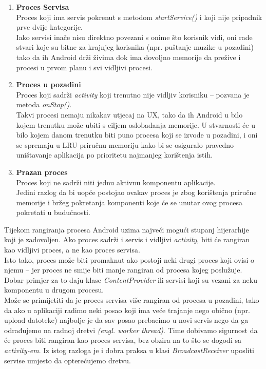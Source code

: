 \documentclass[times, utf8, zavrsni]{fer}
\begin{document}
\begin{enumerate}
\item
\textbf{Proces Servisa}\\
Proces koji ima servis pokrenut s metodom \textit{startService()} i koji nije pripadnik prve dvije kategorije.\\
Iako servisi inače nisu direktno povezani s onime što korisnik vidi, oni rade stvari koje su bitne za krajnjeg korisnika (npr. puštanje muzike u pozadini) tako da ih Android drži živima dok ima dovoljno memorije da prežive i procesi u prvom planu i svi vidljivi procesi.

\item
\textbf{Proces u pozadini}\\
Proces koji sadrži \textit{activity} koji trenutno nije vidljiv korisniku – pozvana je \linebreak metoda \textit{onStop()}.\\
Takvi procesi nemaju nikakav utjecaj na UX, tako da ih Android u bilo kojem trenutku može ubiti s ciljem oslobađanja memorije. U stvarnosti će u bilo kojem danom trenutku biti puno procesa koji se izvode u pozadini, i oni se spremaju u LRU priručnu memoriju kako bi se osiguralo pravedno uništavanje aplikacija po prioritetu najmanjeg korištenja istih.

\item
\textbf{Prazan proces}\\
Proces koji ne sadrži niti jednu aktivnu komponentu aplikacije.\\
Jedini razlog da bi uopće postojao ovakav proces je zbog korištenja priručne memorije i bržeg pokretanja komponenti koje će se unutar ovog procesa pokretati u budućnosti.

\end{enumerate}

Tijekom rangiranja procesa Android uzima najveći mogući stupanj hijerarhije koji je zadovoljen. Ako proces sadrži i servis i vidljivi \textit{activity}, biti će rangiran kao vidljivi proces, a ne kao proces servisa.\\

Isto tako, proces može biti promaknut ako postoji neki drugi proces koji ovisi o njemu – jer proces ne smije biti manje rangiran od procesa kojeg poslužuje. Dobar primjer za to daju klase \textit{ContentProvider} ili servisi koji su vezani za neku komponentu u drugom procesu.\\

Može se primijetiti da je proces servisa više rangiran od procesa u pozadini, tako da ako u aplikaciji radimo neki posao koji ima veće trajanje nego obično (npr. upload datoteke) najbolje je da sav posao prebacimo u novi servis nego da ga odrađujemo na radnoj dretvi \textit{(engl. worker thread)}. Time dobivamo sigurnost da će proces biti rangiran kao proces servisa, bez obzira na to što se dogodi sa \textit{activity-em}. Iz istog razloga je i dobra praksa u klasi \textit{BroadcastReceiver} uposliti servise umjesto da opterećujemo dretvu.
\end{document}
